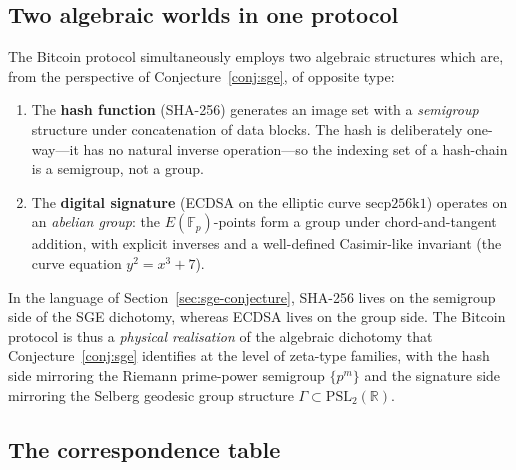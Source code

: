 \documentclass[11pt]{article}
\theoremstyle{definition}
\theoremstyle{remark}
\newcommand{\PSL}{\mathrm{PSL}}
\begin{document}
\subsection{Two algebraic worlds in one protocol}
\label{sec:blockchain-two-worlds}

The Bitcoin protocol simultaneously employs two algebraic structures
which are, from the perspective of Conjecture~\ref{conj:sge}, of
opposite type:

\begin{enumerate}
\item The \textbf{hash function} (SHA-256) generates an image set
  with a \emph{semigroup} structure under concatenation of data
  blocks. The hash is deliberately one-way---it has no natural
  inverse operation---so the indexing set of a hash-chain is a
  semigroup, not a group.
\item The \textbf{digital signature} (ECDSA on the elliptic curve
  $\mathrm{secp256k1}$) operates on an \emph{abelian group}: the
  $E(\mathbb{F}_p)$-points form a group under chord-and-tangent
  addition, with explicit inverses and a well-defined Casimir-like
  invariant (the curve equation $y^2 = x^3 + 7$).
\end{enumerate}

In the language of Section~\ref{sec:sge-conjecture}, SHA-256 lives
on the semigroup side of the SGE dichotomy, whereas ECDSA lives on
the group side. The Bitcoin protocol is thus a \emph{physical
realisation} of the algebraic dichotomy that Conjecture~\ref{conj:sge}
identifies at the level of zeta-type families, with the hash side
mirroring the Riemann prime-power semigroup $\{p^m\}$ and the
signature side mirroring the Selberg geodesic group structure
$\Gamma \subset \PSL_2(\mathbb{R})$.

\subsection{The correspondence table}
\label{sec:blockchain-correspondence}
\end{document}
